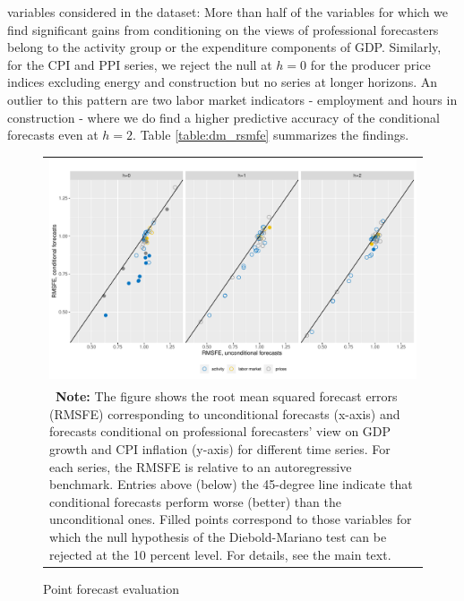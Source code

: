 \documentclass[notitlepage,a4paper,12pt]{article}
\begin{document}
variables considered in the dataset: More than half of the variables for which we find significant gains from conditioning on the views of professional forecasters belong to the activity group or the expenditure components of GDP. Similarly, for the CPI and PPI series, we reject the null at $h=0$ for the producer price indices excluding energy and construction but no series at longer horizons. An outlier to this pattern are two labor market indicators - employment and hours in construction - where we do find a higher predictive accuracy of the conditional forecasts even at $h=2$. Table \ref{table:dm_rsmfe} summarizes the findings. 

\begin{figure}[htp!] \centering
    \caption{Point forecast evaluation \label{fig:rsmfe}}
    \footnotesize
    \begin{tabular}{p{16cm}}
        \multicolumn{1}{c}{\includegraphics*[scale = 0.6]{../figures/fig_eval_rmsfe.pdf}} \\
        {
        \footnotesize \textbf{Note:} The figure shows the root mean squared forecast errors (RMSFE)  corresponding to unconditional forecasts (x-axis) and forecasts conditional on professional forecasters' view on GDP growth and CPI inflation (y-axis) for different time series. For each series, the RMSFE is relative to an autoregressive benchmark. Entries above (below) the 45-degree line indicate that conditional forecasts perform worse (better) than the unconditional ones. Filled points correspond to those variables for which the null hypothesis of the Diebold-Mariano test can be rejected at the 10 percent level. For details, see the main text. 
        }
        \end{tabular}
    \newline
    \normalsize
\end{figure}
\end{document}
